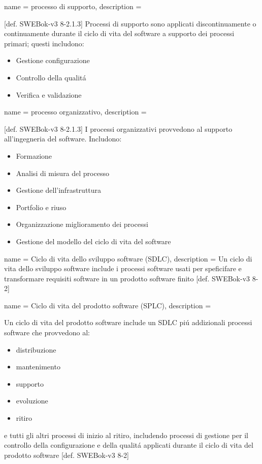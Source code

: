{
name = processo di supporto,
description = {[def. SWEBok-v3 8-2.1.3] Processi di supporto sono applicati discontinuamente o continuamente durante il ciclo di vita del software a supporto dei processi primari; questi includono:\begin{itemize}
\item Gestione configurazione
\item Controllo della qualit\'a
\item Verifica e validazione
\end{itemize}
}
}

{
name = processo organizzativo,
description = {[def. SWEBok-v3 8-2.1.3] I processi organizzativi provvedono al supporto all'ingegneria del software. Includono: \begin{itemize}
\item Formazione
\item Analisi di misura del processo
\item Gestione dell'infrastruttura
\item Portfolio e riuso
\item Organizzazione miglioramento dei processi
\item Gestione del modello del ciclo di vita del software
\end{itemize}
}
}

{
name = Ciclo di vita dello sviluppo software (SDLC),
description = {Un ciclo di vita dello sviluppo software include i processi software usati per speficifare e transformare requisiti software in un prodotto software finito [def. SWEBok-v3 8-2] 
}
}

{
name = Ciclo di vita del prodotto software (SPLC),
description = {Un ciclo di vita del prodotto software include un SDLC pi\'u addizionali processi software che provvedono al: \begin{itemize}
\item distribuzione
\item mantenimento
\item supporto
\item evoluzione
\item ritiro
\end{itemize}
e tutti gli altri processi di inizio al ritiro, includendo processi di gestione per il controllo della configurazione e della qualit\'a applicati durante il ciclo di vita del prodotto software [def. SWEBok-v3 8-2]}
}

